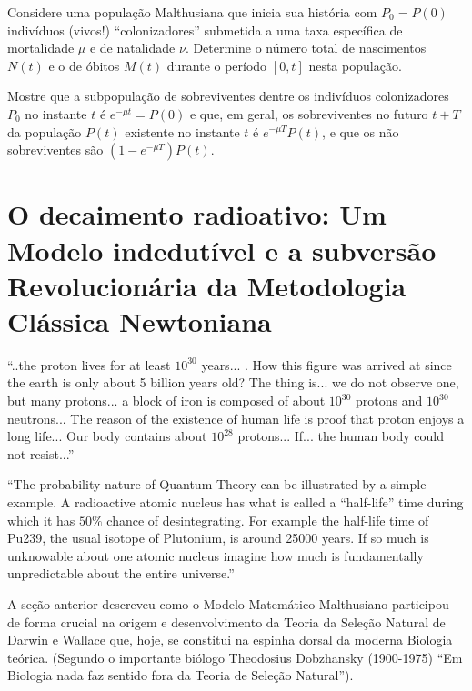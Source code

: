 \begin{exercise}
Considere uma população Malthusiana que inicia sua história com \(P_0 = P(0)\) indivíduos (vivos!) ``colonizadores'' submetida a uma taxa específica de mortalidade \(\mu\) e de natalidade \(\nu\). Determine o número total de nascimentos \(N(t)\) e o de óbitos \(M(t)\) durante o período \([0,t]\) nesta população.
\end{exercise}

\begin{exercise}
Mostre que a subpopulação de sobreviventes dentre os indivíduos colonizadores \(P_0\) no instante \(t\) é \(e^{-\mu t} = P(0)\) e que, em geral, os sobreviventes no futuro \(t+T\) da população \(P(t)\) existente no instante \(t\) é \(e^{-\mu T} P(t)\), e que os não sobreviventes são \((1-e^{-\mu T}) P(t)\).
\end{exercise}

\section{O decaimento radioativo: Um Modelo indedutível e a subversão Revolucionária da Metodologia Clássica Newtoniana}

\begin{citacao}
    ``..the proton lives for at least \(10^{30}\) years... . How this figure was arrived at since the earth is only about 5 billion years old? The thing is... we do not observe one, but many protons... a block of iron is composed of about \(10^{30}\) protons and \(10^{30}\) neutrons... The reason of the existence of human life is proof that proton enjoys a long life... Our body contains about \(10^{28}\) protons... If... the human body could not resist...''
    
    
    ``The probability nature of Quantum Theory can be illustrated by a simple example. A radioactive atomic nucleus has what is called a ``half-life'' time during which it has \(50\%\) chance of desintegrating. For example the half-life time of Pu239, the usual isotope of Plutonium, is around 25000 years. If so much is unknowable about one atomic nucleus imagine how much is fundamentally unpredictable about the entire universe.''
    
\end{citacao}

    A seção anterior descreveu como o Modelo Matemático Malthusiano participou de forma crucial na origem e desenvolvimento da Teoria da Seleção Natural de Darwin e Wallace que, hoje, se constitui na espinha dorsal da moderna Biologia teórica. (Segundo o importante biólogo Theodosius Dobzhansky (1900-1975) ``Em Biologia nada faz sentido fora da Teoria de Seleção Natural'').

